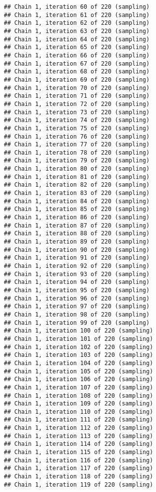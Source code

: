 \documentclass[]{book}
\begin{document}
\begin{verbatim}
## Chain 1, iteration 60 of 220 (sampling)
## Chain 1, iteration 61 of 220 (sampling)
## Chain 1, iteration 62 of 220 (sampling)
## Chain 1, iteration 63 of 220 (sampling)
## Chain 1, iteration 64 of 220 (sampling)
## Chain 1, iteration 65 of 220 (sampling)
## Chain 1, iteration 66 of 220 (sampling)
## Chain 1, iteration 67 of 220 (sampling)
## Chain 1, iteration 68 of 220 (sampling)
## Chain 1, iteration 69 of 220 (sampling)
## Chain 1, iteration 70 of 220 (sampling)
## Chain 1, iteration 71 of 220 (sampling)
## Chain 1, iteration 72 of 220 (sampling)
## Chain 1, iteration 73 of 220 (sampling)
## Chain 1, iteration 74 of 220 (sampling)
## Chain 1, iteration 75 of 220 (sampling)
## Chain 1, iteration 76 of 220 (sampling)
## Chain 1, iteration 77 of 220 (sampling)
## Chain 1, iteration 78 of 220 (sampling)
## Chain 1, iteration 79 of 220 (sampling)
## Chain 1, iteration 80 of 220 (sampling)
## Chain 1, iteration 81 of 220 (sampling)
## Chain 1, iteration 82 of 220 (sampling)
## Chain 1, iteration 83 of 220 (sampling)
## Chain 1, iteration 84 of 220 (sampling)
## Chain 1, iteration 85 of 220 (sampling)
## Chain 1, iteration 86 of 220 (sampling)
## Chain 1, iteration 87 of 220 (sampling)
## Chain 1, iteration 88 of 220 (sampling)
## Chain 1, iteration 89 of 220 (sampling)
## Chain 1, iteration 90 of 220 (sampling)
## Chain 1, iteration 91 of 220 (sampling)
## Chain 1, iteration 92 of 220 (sampling)
## Chain 1, iteration 93 of 220 (sampling)
## Chain 1, iteration 94 of 220 (sampling)
## Chain 1, iteration 95 of 220 (sampling)
## Chain 1, iteration 96 of 220 (sampling)
## Chain 1, iteration 97 of 220 (sampling)
## Chain 1, iteration 98 of 220 (sampling)
## Chain 1, iteration 99 of 220 (sampling)
## Chain 1, iteration 100 of 220 (sampling)
## Chain 1, iteration 101 of 220 (sampling)
## Chain 1, iteration 102 of 220 (sampling)
## Chain 1, iteration 103 of 220 (sampling)
## Chain 1, iteration 104 of 220 (sampling)
## Chain 1, iteration 105 of 220 (sampling)
## Chain 1, iteration 106 of 220 (sampling)
## Chain 1, iteration 107 of 220 (sampling)
## Chain 1, iteration 108 of 220 (sampling)
## Chain 1, iteration 109 of 220 (sampling)
## Chain 1, iteration 110 of 220 (sampling)
## Chain 1, iteration 111 of 220 (sampling)
## Chain 1, iteration 112 of 220 (sampling)
## Chain 1, iteration 113 of 220 (sampling)
## Chain 1, iteration 114 of 220 (sampling)
## Chain 1, iteration 115 of 220 (sampling)
## Chain 1, iteration 116 of 220 (sampling)
## Chain 1, iteration 117 of 220 (sampling)
## Chain 1, iteration 118 of 220 (sampling)
## Chain 1, iteration 119 of 220 (sampling)

\end{verbatim}
\end{document}
